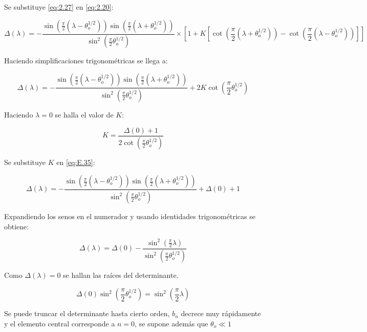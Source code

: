  Se substituye \ref{eq:2.27} en \ref{eq:2.20}:
 
 \begin{equation}\label{eq:E.33}
    \Delta(\lambda)= -\frac{\sin(\frac{\pi}{2}(\lambda-\theta_o^{1/2}))\sin(\frac{\pi}{2}(\lambda+ \theta_o^{1/2}))}{\sin^2(\frac{\pi}{2}\theta_o^{1/2})}\times\left[1+K\left[\cot(\frac{\pi}{2}(\lambda+\theta_o^{1/2}))-\cot(\frac{\pi}{2}(\lambda-\theta_o^{1/2}))\right]\right]
\end{equation}

Haciendo simplificaciones trigonométricas se llega a:

\begin{equation}\label{eq:E.35}
    \Delta(\lambda)= -\frac{\sin(\frac{\pi}{2}(\lambda-\theta_o^{1/2}))\sin(\frac{\pi}{2}(\lambda+ \theta_o^{1/2}))}{\sin^2(\frac{\pi}{2}\theta_o^{1/2})}+2K\cot(\frac{\pi}{2}\theta_o^{1/2})
\end{equation}

Haciendo $\lambda=0$ se halla el valor de $K$:

\begin{equation}\label{eq:E.36}
    K= \frac{\Delta(0)+1}{2\cot(\frac{\pi}{2}\theta_o^{1/2})}
\end{equation}

Se substituye $K$ en \ref{eq:E.35}:

\begin{equation}\label{eq:E.37}
    \Delta(\lambda)= -\frac{\sin(\frac{\pi}{2}(\lambda-\theta_o^{1/2}))\sin(\frac{\pi}{2}(\lambda+ \theta_o^{1/2}))}{\sin^2(\frac{\pi}{2}\theta_o^{1/2})}+\Delta(0)+1
\end{equation}

Expandiendo los senos en el numerador y usando identidades trigonométricas se obtiene:


\begin{equation}\label{eq:E.38}
\Delta(\lambda)=\Delta(0)-\frac{\sin^2(\frac{\pi}{2}\lambda)}{\sin^2(\frac{\pi}{2}\theta_o^{1/2})}
\end{equation}

Como $\Delta(\lambda)=0$ se hallan las raíces del determinante.

\begin{equation}\label{eq:E.39}
\Delta(0)\sin^2(\frac{\pi}{2}\theta_o^{1/2})=\sin^2(\frac{\pi}{2}\lambda)
\end{equation}

Se puede truncar el determinante hasta cierto orden, $b_n$ decrece muy rápidamente y el elemento central corresponde a $n=0$, se supone además que $\theta_o \ll 1$ 

